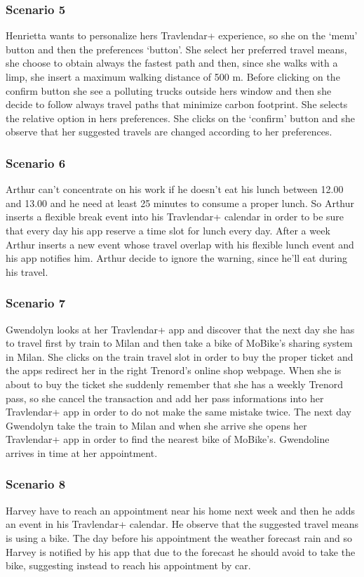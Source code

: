 	\subsubsection{Scenario 5}
		Henrietta wants to personalize hers Travlendar+ experience, so she on the ‘menu’ button and then the preferences ‘button’. She select her preferred travel means, she choose to obtain always the fastest path and then, since she walks with a limp, she insert a maximum walking distance of 500 m. Before clicking on the confirm button she see a polluting trucks outside hers window and then she decide to follow always travel paths that minimize carbon footprint. She selects the relative option in hers preferences. She clicks on the ‘confirm’ button and she observe that her suggested travels are changed according to her preferences.
	\subsubsection{Scenario 6}
		Arthur can’t concentrate on his work if he doesn’t eat his lunch between 12.00 and 13.00 and he need at least 25 minutes to consume a proper lunch.
So Arthur inserts a flexible break event into his Travlendar+ calendar in order to be sure that every day his app reserve a time slot for lunch every day.
After a week Arthur inserts a new event whose travel overlap with his flexible lunch event and his app notifies him. Arthur decide to ignore the warning, since he’ll eat during his travel.
	\subsubsection{Scenario 7}
		Gwendolyn looks at her Travlendar+ app and discover that the next day she has to travel first by train to Milan and then take a bike of MoBike’s sharing system in Milan. She clicks on the train travel slot in order to buy the proper ticket and the apps redirect her in the right Trenord’s online shop webpage. When she is about to buy the ticket she suddenly remember that she has a weekly Trenord pass, so she cancel the transaction and add her pass informations into her Travlendar+ app in order to do not make the same mistake twice. The next day Gwendolyn take the train to Milan and when she arrive she opens her Travlendar+ app in order to find the nearest bike of MoBike’s. Gwendoline arrives in time at her appointment.
	\subsubsection{Scenario 8}
		Harvey have to reach an appointment near his home next week and then he adds an event in his Travlendar+ calendar. He observe that the suggested travel means is using a bike. The day before his appointment the weather forecast rain and so Harvey is notified by his app that due to the forecast he should avoid to take the bike, suggesting instead to reach his appointment by car.
